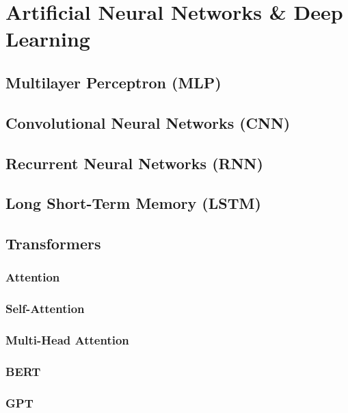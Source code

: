 \chapter{Artificial Neural Networks \& Deep Learning}
\label{ch:neural-networks}
\framedtext{\color{red}{TODO:}}
\section{Multilayer Perceptron (MLP)}
\label{sec:mlp}
\framedtext{\color{red}{TODO:}}
\section{Convolutional Neural Networks (CNN)}
\label{sec:cnn}
\framedtext{\color{red}{TODO:}}
\section{Recurrent Neural Networks (RNN)}
\label{sec:rnn}
\framedtext{\color{red}{TODO:}}
\section{Long Short-Term Memory (LSTM)}
\label{sec:lstm}
\framedtext{\color{red}{TODO:}}
\section{Transformers}
\label{sec:transformers}
\framedtext{\color{red}{TODO:}}
\subsection{Attention}
\label{subsec:attention}
\framedtext{\color{red}{TODO:}}
\subsection{Self-Attention}
\label{subsec:self-attention}
\framedtext{\color{red}{TODO:}}
\subsection{Multi-Head Attention}
\label{subsec:multi-head-attention}
\framedtext{\color{red}{TODO:}}
\subsection{BERT}
\label{subsec:bert}
\framedtext{\color{red}{TODO:}}
\subsection{GPT}
\label{subsec:gpt}
\framedtext{\color{red}{TODO:}}

